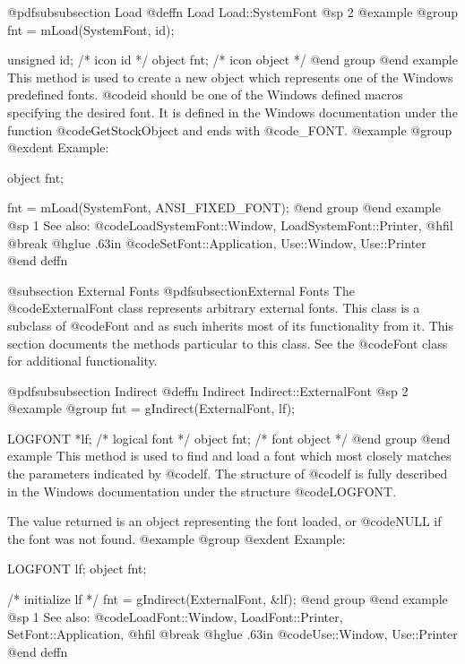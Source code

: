 @pdfsubsubsection {Load}
@deffn {Load} Load::SystemFont
@sp 2
@example
@group
fnt = mLoad(SystemFont, id);

unsigned id;    /*  icon id      */
object   fnt;   /*  icon object  */
@end group
@end example
This method is used to create a new object which represents one of the
Windows predefined fonts.  @code{id} should be one of the Windows
defined macros specifying the desired font.  It is defined in the
Windows documentation under the function @code{GetStockObject} and
ends with @code{_FONT}.
@example
@group
@exdent Example:

object  fnt;

fnt = mLoad(SystemFont, ANSI_FIXED_FONT);
@end group
@end example
@sp 1
See also:  @code{LoadSystemFont::Window, LoadSystemFont::Printer,}
@hfil @break @hglue .63in @code{SetFont::Application, Use::Window, Use::Printer}
@end deffn











@subsection External Fonts
@pdfsubsection{External Fonts}
The @code{ExternalFont} class represents arbitrary external fonts.  This
class is a subclass of @code{Font} and as such inherits most of its
functionality from it.  This section documents the methods particular to
this class.  See the @code{Font} class for additional functionality.









@pdfsubsubsection {Indirect}
@deffn {Indirect} Indirect::ExternalFont
@sp 2
@example
@group
fnt = gIndirect(ExternalFont, lf);

LOGFONT *lf;    /*  logical font  */
object  fnt;    /*  font object   */
@end group
@end example
This method is used to find and load a font which most closely matches
the parameters indicated by @code{lf}.  The structure of @code{lf} is
fully described in the Windows documentation under the structure
@code{LOGFONT}.

The value returned is an object representing the font loaded, or
@code{NULL} if the font was not found.
@example
@group
@exdent Example:

LOGFONT lf;
object  fnt;

/*  initialize lf  */
fnt = gIndirect(ExternalFont, &lf);
@end group
@end example
@sp 1
See also:  @code{LoadFont::Window, LoadFont::Printer, SetFont::Application,}
@hfil @break @hglue .63in @code{Use::Window, Use::Printer}
@end deffn











